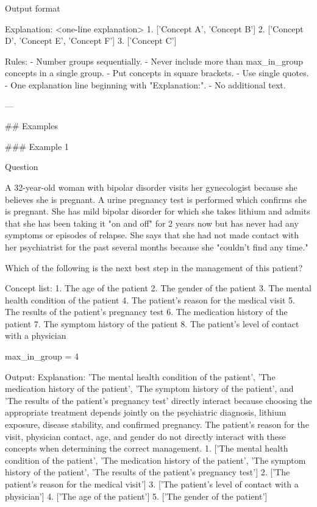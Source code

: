 \begin{promptbox}
Output format

Explanation: <one-line explanation>
1. ['Concept A', 'Concept B']
2. ['Concept D', 'Concept E', 'Concept F']
3. ['Concept C']

Rules:
- Number groups sequentially.
- Never include more than max_in_group concepts in a single group.
- Put concepts in square brackets.
- Use single quotes.
- One explanation line beginning with "Explanation:".
- No additional text.

---

## Examples

### Example 1

Question

A 32-year-old woman with bipolar disorder visits her gynecologist because she believes she is pregnant. A urine pregnancy test is performed which confirms she is pregnant. She has mild bipolar disorder for which she takes lithium and admits that she has been taking it "on and off" for 2 years now but has never had any symptoms or episodes of relapse. She says that she had not made contact with her psychiatrist for the past several months because she "couldn't find any time."

Which of the following is the next best step in the management of this patient?

Concept list:
1. The age of the patient
2. The gender of the patient
3. The mental health condition of the patient
4. The patient's reason for the medical visit
5. The results of the patient's pregnancy test
6. The medication history of the patient
7. The symptom history of the patient
8. The patient's level of contact with a physician

max_in_group = 4

Output:
Explanation: 'The mental health condition of the patient', 'The medication history of the patient', 'The symptom history of the patient', and 'The results of the patient's pregnancy test' directly interact because choosing the appropriate treatment depends jointly on the psychiatric diagnosis, lithium exposure, disease stability, and confirmed pregnancy. The patient's reason for the visit, physician contact, age, and gender do not directly interact with these concepts when determining the correct management.
1. ['The mental health condition of the patient', 'The medication history of the patient', 'The symptom history of the patient', 'The results of the patient's pregnancy test']
2. ['The patient's reason for the medical visit']
3. ['The patient's level of contact with a physician']
4. ['The age of the patient']
5. ['The gender of the patient']


\end{promptbox}
